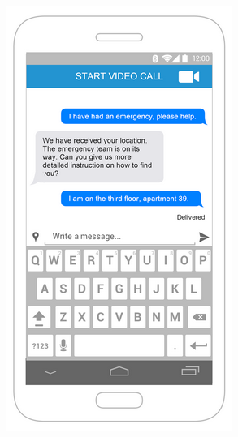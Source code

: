 \documentclass{article}
\begin{document}
	\begin{figure}
\centering
\begin{subfigure}{.5\textwidth}
  \centering
  \includegraphics[width=.9\linewidth]{"Chat/9"}
  

\end{subfigure}
\end{figure}
\end{document}

